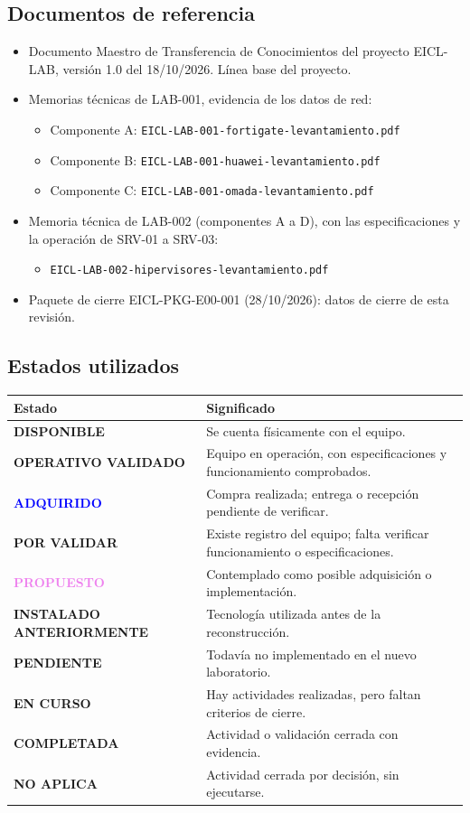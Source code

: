 \documentclass[11pt,a4paper]{article}
\newcommand{\estadobase}[2]{\textcolor{#1}{\textbf{\footnotesize #2}}}
\newcommand{\disp}{\estadobase{okgreen}{DISPONIBLE}}
\newcommand{\adq}{\estadobase{blue}{ADQUIRIDO}}
\newcommand{\porval}{\estadobase{amber}{POR VALIDAR}}
\newcommand{\prop}{\estadobase{violet}{PROPUESTO}}
\newcommand{\ant}{\estadobase{muted}{INSTALADO ANTERIORMENTE}}
\newcommand{\pend}{\estadobase{alertred}{PENDIENTE}}
\newcommand{\curso}{\estadobase{amber}{EN CURSO}}
\newcommand{\compl}{\estadobase{okgreen}{COMPLETADA}}
\newcommand{\opval}{\estadobase{okgreen}{OPERATIVO VALIDADO}}
\newcommand{\noapl}{\estadobase{muted}{NO APLICA}}
\begin{document}
\subsection{Documentos de referencia}
\begin{itemize}
  \item Documento Maestro de Transferencia de Conocimientos del proyecto EICL-LAB, versión 1.0 del 18/10/2026. Línea base del proyecto.
  \item Memorias técnicas de LAB-001, evidencia de los datos de red:
  \begin{itemize}
    \item Componente A: \texttt{\small EICL-LAB-001-fortigate-levantamiento.pdf}
    \item Componente B: \texttt{\small EICL-LAB-001-huawei-levantamiento.pdf}
    \item Componente C: \texttt{\small EICL-LAB-001-omada-levantamiento.pdf}
  \end{itemize}
  \item Memoria técnica de LAB-002 (componentes A a D), con las especificaciones y la operación de SRV-01 a SRV-03:
  \begin{itemize}
    \item \texttt{\small EICL-LAB-002-hipervisores-levantamiento.pdf}
  \end{itemize}
  \item Paquete de cierre EICL-PKG-E00-001 (28/10/2026): datos de cierre de esta revisión.
\end{itemize}

\subsection{Estados utilizados}
\begin{tabularx}{\textwidth}{L{4.6cm} Z}
  \toprule
  \textbf{Estado} & \textbf{Significado}\\
  \midrule
  \disp & Se cuenta físicamente con el equipo.\\
  \opval & Equipo en operación, con especificaciones y funcionamiento comprobados.\\
  \adq & Compra realizada; entrega o recepción pendiente de verificar.\\
  \porval & Existe registro del equipo; falta verificar funcionamiento o especificaciones.\\
  \prop & Contemplado como posible adquisición o implementación.\\
  \ant & Tecnología utilizada antes de la reconstrucción.\\
  \pend & Todavía no implementado en el nuevo laboratorio.\\
  \curso & Hay actividades realizadas, pero faltan criterios de cierre.\\
  \compl & Actividad o validación cerrada con evidencia.\\
  \noapl & Actividad cerrada por decisión, sin ejecutarse.\\
  \bottomrule
\end{tabularx}
\end{document}
